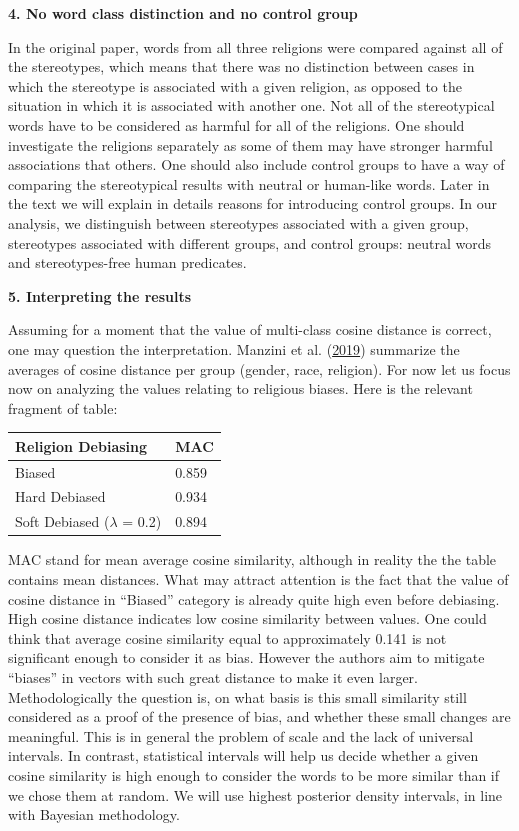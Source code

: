 \documentclass[12pt,]{book}
\begin{document}
\pagebreak 

\textbf{4. No word class distinction and no control group}

In the original paper, words from all three religions were compared
against all of the stereotypes, which means that there was no
distinction between cases in which the stereotype is associated with a
given religion, as opposed to the situation in which it is associated
with another one. Not all of the stereotypical words have to be
considered as harmful for all of the religions. One should investigate
the religions separately as some of them may have stronger harmful
associations that others. One should also include control groups to have
a way of comparing the stereotypical results with neutral or human-like
words. Later in the text we will explain in details reasons for
introducing control groups. In our analysis, we distinguish between
stereotypes associated with a given group, stereotypes associated with
different groups, and control groups: neutral words and stereotypes-free
human predicates.

\textbf{5. Interpreting the results}

Assuming for a moment that the value of multi-class cosine distance is
correct, one may question the interpretation. Manzini et al.
(\protect\hyperlink{ref-Manzini2019blackToCriminal}{2019}) summarize the
averages of cosine distance per group (gender, race, religion). For now
let us focus now on analyzing the values relating to religious biases.
Here is the relevant fragment of table:

\begin{longtable}[]{@{}ll@{}}
\toprule
Religion Debiasing & MAC\tabularnewline
\midrule
\endhead
Biased & 0.859\tabularnewline
Hard Debiased & 0.934\tabularnewline
Soft Debiased (\(\lambda\) = 0.2) & 0.894\tabularnewline
\bottomrule
\end{longtable}

MAC stand for mean average cosine similarity, although in reality the
the table contains mean distances. What may attract attention is the
fact that the value of cosine distance in ``Biased'' category is already
quite high even before debiasing. High cosine distance indicates low
cosine similarity between values. One could think that average cosine
similarity equal to approximately 0.141 is not significant enough to
consider it as bias. However the authors aim to mitigate ``biases'' in
vectors with such great distance to make it even larger.
Methodologically the question is, on what basis is this small similarity
still considered as a proof of the presence of bias, and whether these
small changes are meaningful. This is in general the problem of scale
and the lack of universal intervals. In contrast, statistical intervals
will help us decide whether a given cosine similarity is high enough to
consider the words to be more similar than if we chose them at random.
We will use highest posterior density intervals, in line with Bayesian
methodology.
\end{document}
